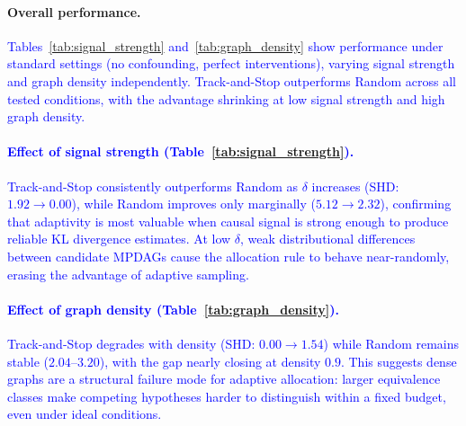 \documentclass{article}
\newcommand{\added}[1]{\textcolor{blue}{#1}}
\begin{document}
\paragraph{Overall performance.}
\added{Tables~\ref{tab:signal_strength} and~\ref{tab:graph_density} show performance under standard settings (no confounding, perfect interventions), varying signal strength and graph density independently. Track-and-Stop outperforms Random across all tested conditions, with the advantage shrinking at low signal strength and high graph density.}

\added{\paragraph{Effect of signal strength (Table~\ref{tab:signal_strength}).}
Track-and-Stop consistently outperforms Random as $\delta$ increases (SHD: $1.92 \to 0.00$), while Random improves only marginally ($5.12 \to 2.32$), confirming that adaptivity is most valuable when causal signal is strong enough to produce reliable KL divergence estimates. At low $\delta$, weak distributional differences between candidate MPDAGs cause the allocation rule to behave near-randomly, erasing the advantage of adaptive sampling.}

\added{\paragraph{Effect of graph density (Table~\ref{tab:graph_density}).}
Track-and-Stop degrades with density (SHD: $0.00 \to 1.54$) while Random remains stable ($2.04$--$3.20$), with the gap nearly closing at density $0.9$. This suggests dense graphs are a structural failure mode for adaptive allocation: larger equivalence classes make competing hypotheses harder to distinguish within a fixed budget, even under ideal conditions.}
\end{document}
